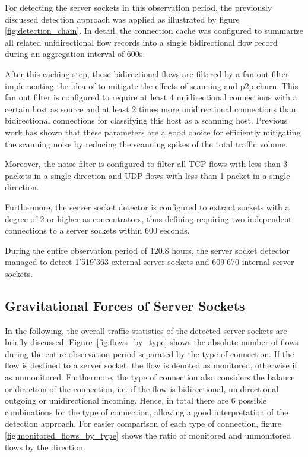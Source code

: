 For detecting the server sockets in this observation period, the previously 
discussed detection approach was applied as illustrated by figure 
\ref{fig:detection_chain}. In detail, the connection cache was configured to 
summarize all related unidirectional flow records into a single bidirectional 
flow record during an aggregation interval of 600s. 

After this caching step, these bidirectional flows are filtered by a fan out 
filter implementing the idea of \citet{Allman:2007} to mitigate the effects of 
scanning and p2p churn. This fan out filter is configured to require at least 4 
unidirectional connections with a certain host as source and at least 2 times 
more unidirectional connections than bidirectional connections for classifying 
this host as a scanning host. Previous 
work\citep{Schatzmann:Mining,Schatzmann:Dissection, Schatzmann:Tracing} has 
shown that these parameters are a good choice for efficiently mitigating the 
scanning noise by reducing the scanning spikes of the total traffic volume. 

Moreover, the noise filter is configured to filter all TCP flows with less than 
3 packets in a single direction and UDP flows with less than 1 packet in a 
single direction. 

Furthermore, the server socket detector is configured to extract sockets with a 
degree of 2 or higher as concentrators, thus defining requiring two independent 
connections to a server sockets within 600 seconds. 

During the entire observation period of 120.8 hours, the server socket detector 
managed to detect 1'519'363 external server sockets and 609'670 internal server 
sockets.

\subsection{Gravitational Forces of Server Sockets}
In the following, the overall traffic statistics of the detected server sockets 
are briefly discussed. Figure \ref{fig:flows_by_type} shows the absolute number 
of flows during the entire observation period separated by the type of 
connection. If the flow is destined to a server socket, the flow is denoted as 
monitored, otherwise if as unmonitored. Furthermore, the type of connection also 
considers the balance or direction of the connection, i.e. if the flow is 
bidirectional, unidirectional outgoing or unidirectional incoming. Hence, in 
total there are 6 possible combinations for the type of connection, allowing a 
good interpretation of the detection approach. For easier comparison of each 
type of connection, figure \ref{fig:monitored_flows_by_type} shows the ratio of 
monitored and unmonitored flows by the direction.

